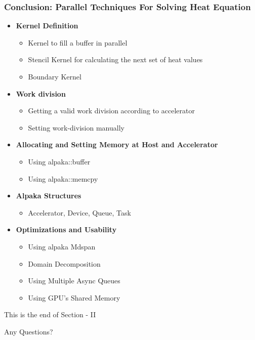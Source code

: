 \documentclass[9pt]{beamer}
\begin{document}
\begin{frame}
\frametitle{Conclusion: Parallel Techniques For Solving Heat Equation}
\begin{itemize}
    \item \textbf{Kernel Definition}
    \begin{itemize}
        \item Kernel to fill a buffer in parallel
        \item Stencil Kernel for calculating the next set of heat values
        \item Boundary Kernel
    \end{itemize}
    \item \textbf{Work division}
    \begin{itemize}
        \item Getting a valid work division according to accelerator
        \item Setting work-division manually
    \end{itemize}
    \item \textbf{Allocating and Setting Memory at Host and Accelerator }
    \begin{itemize}
        \item Using alpaka::buffer
        \item Using alpaka::memcpy
    \end{itemize}
    \item \textbf{Alpaka Structures}
    \begin{itemize}
        \item Accelerator, Device, Queue, Task
    \end{itemize}
    \item \textbf{Optimizations and Usability}
    \begin{itemize}
        \item Using alpaka Mdspan
        \item Domain Decomposition
        \item Using Multiple Async Queues
        \item Using GPU's Shared Memory
    \end{itemize}
\end{itemize}
\end{frame}


\begin{frame}
\Huge{\centerline{This is the end of Section - II}}
\Huge{\centerline{Any Questions?}}
\end{frame}

\end{document}
